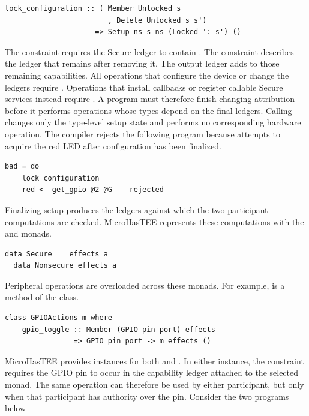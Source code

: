 \documentclass[sigconf]{acmart}
\begin{document}
\begin{lstlisting}[style=haskell]
  lock_configuration :: ( Member Unlocked s
                        , Delete Unlocked s s')
                     => Setup ns s ns (Locked ': s') ()
\end{lstlisting}

The  constraint requires the Secure ledger to contain .
The  constraint describes the ledger that remains after removing it.
The output ledger adds  to those remaining capabilities.
All operations that configure the device or change the ledgers require .
Operations that install callbacks or register callable Secure services instead require .
A program must therefore finish changing attribution before it performs operations whose types depend on the final ledgers.
Calling  changes only the type-level setup state and performs no corresponding hardware operation.
The compiler rejects the following program because  attempts to acquire the red LED after configuration has been finalized.

\begin{lstlisting}[style=haskell]
  bad = do
    lock_configuration
    red <- get_gpio @2 @G -- rejected
\end{lstlisting}

Finalizing setup produces the ledgers against which the two participant computations are checked.
MicroHasTEE represents these computations with the  and  monads.

\begin{lstlisting}[style=haskell]
  data Secure    effects a
  data Nonsecure effects a
\end{lstlisting}

Peripheral operations are overloaded across these monads.
For example,  is a method of the  class.

\begin{lstlisting}[style=haskell]
  class GPIOActions m where
    gpio_toggle :: Member (GPIO pin port) effects
                => GPIO pin port -> m effects ()
\end{lstlisting}

MicroHasTEE provides  instances for both  and .
In either instance, the  constraint requires the GPIO pin to occur in the capability ledger attached to the selected monad.
The same operation can therefore be used by either participant, but only when that participant has authority over the pin.
Consider the two programs below
\end{document}
